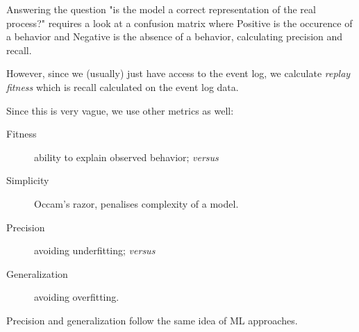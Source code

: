 Answering the question "is the model a correct representation of the real process?" requires a look at a confusion matrix where Positive is the occurence of a behavior and Negative is the absence of a behavior, calculating precision and recall.

However, since we (usually) just have access to the event log, we calculate \emph{replay fitness} which is recall calculated on the event log data.

Since this is very vague, we use other metrics as well:

\begin{description}
	\item[Fitness] ability to explain observed behavior; \emph{versus}
	\item[Simplicity] Occam's razor, penalises complexity of a model.
	\item[Precision] avoiding underfitting; \emph{versus}
	\item[Generalization] avoiding overfitting.
\end{description}

Precision and generalization follow the same idea of ML approaches.
